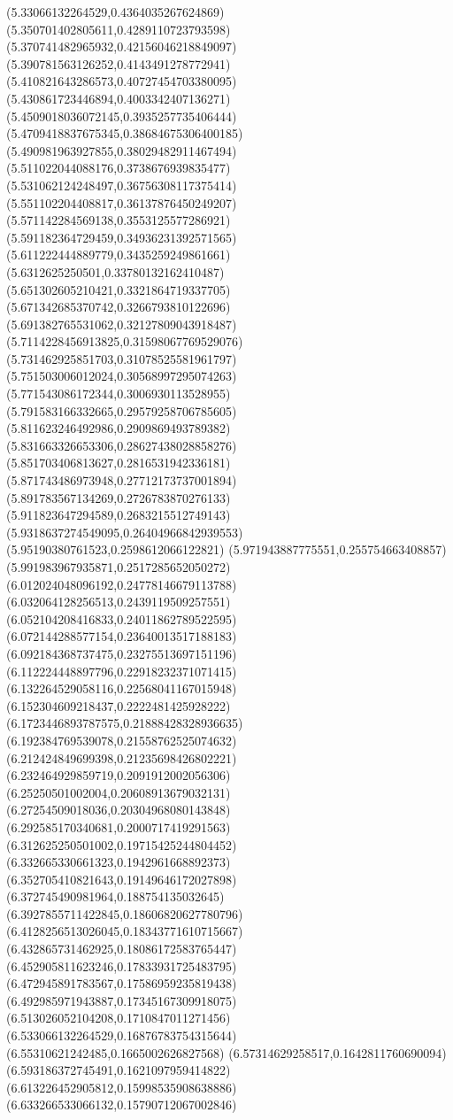 {(5.33066132264529,0.4364035267624869)
(5.350701402805611,0.4289110723793598)
(5.370741482965932,0.42156046218849097)
(5.390781563126252,0.4143491278772941)
(5.410821643286573,0.40727454703380095)
(5.430861723446894,0.4003342407136271)
(5.4509018036072145,0.3935257735406444)
(5.4709418837675345,0.38684675306400185)
(5.490981963927855,0.38029482911467494)
(5.511022044088176,0.3738676939835477)
(5.531062124248497,0.36756308117375414)
(5.551102204408817,0.36137876450249207)
(5.571142284569138,0.3553125577286921)
(5.591182364729459,0.34936231392571565)
(5.611222444889779,0.3435259249861661)
(5.6312625250501,0.33780132162410487)
(5.651302605210421,0.3321864719337705)
(5.671342685370742,0.3266793810122696)
(5.691382765531062,0.32127809043918487)
(5.7114228456913825,0.31598067769529076)
(5.731462925851703,0.31078525581961797)
(5.751503006012024,0.30568997295074263)
(5.771543086172344,0.3006930113528955)
(5.791583166332665,0.29579258706785605)
(5.811623246492986,0.2909869493789382)
(5.831663326653306,0.28627438028858276)
(5.851703406813627,0.2816531942336181)
(5.871743486973948,0.27712173737001894)
(5.891783567134269,0.2726783870276133)
(5.911823647294589,0.2683215512749143)
(5.9318637274549095,0.26404966842939553)
(5.95190380761523,0.2598612066122821)
(5.971943887775551,0.255754663408857)
(5.991983967935871,0.2517285652050272)
(6.012024048096192,0.24778146679113788)
(6.032064128256513,0.2439119509257551)
(6.052104208416833,0.24011862789522595)
(6.072144288577154,0.23640013517188183)
(6.092184368737475,0.23275513697151196)
(6.112224448897796,0.22918232371071415)
(6.132264529058116,0.22568041167015948)
(6.152304609218437,0.2222481425928222)
(6.1723446893787575,0.21888428328936635)
(6.192384769539078,0.21558762525074632)
(6.212424849699398,0.21235698426802221)
(6.232464929859719,0.2091912002056306)
(6.25250501002004,0.20608913679032131)
(6.27254509018036,0.20304968080143848)
(6.292585170340681,0.2000717419291563)
(6.312625250501002,0.19715425244804452)
(6.332665330661323,0.1942961668892373)
(6.352705410821643,0.19149646172027898)
(6.372745490981964,0.188754135032645)
(6.3927855711422845,0.18606820627780796)
(6.4128256513026045,0.18343771610715667)
(6.432865731462925,0.18086172583765447)
(6.452905811623246,0.17833931725483795)
(6.472945891783567,0.17586959235819438)
(6.492985971943887,0.17345167309918075)
(6.513026052104208,0.1710847011271456)
(6.533066132264529,0.16876783754315644)
(6.55310621242485,0.1665002626827568)
(6.57314629258517,0.1642811760690094)
(6.593186372745491,0.1621097959414822)
(6.613226452905812,0.15998535908638886)
(6.633266533066132,0.15790712067002846)
}
